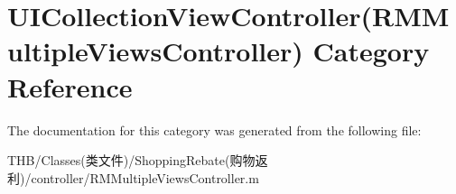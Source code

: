 \hypertarget{category_u_i_collection_view_controller_07_r_m_multiple_views_controller_08}{}\section{U\+I\+Collection\+View\+Controller(R\+M\+Multiple\+Views\+Controller) Category Reference}
\label{category_u_i_collection_view_controller_07_r_m_multiple_views_controller_08}


The documentation for this category was generated from the following file\+:\begin{DoxyCompactItemize}
\item 
T\+H\+B/\+Classes(类文件)/\+Shopping\+Rebate(购物返利)/controller/R\+M\+Multiple\+Views\+Controller.\+m\end{DoxyCompactItemize}
